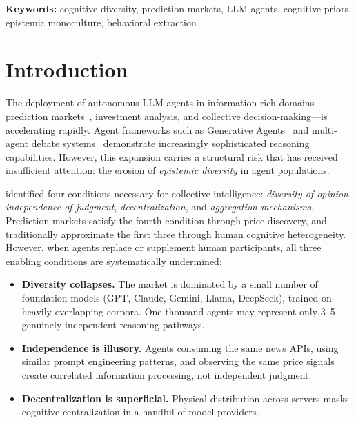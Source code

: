 \documentclass[11pt]{article}
\begin{document}
\vspace{0.5em}
\noindent\textbf{Keywords:} cognitive diversity, prediction markets, LLM agents, cognitive priors, epistemic monoculture, behavioral extraction

\section{Introduction}
\label{sec:intro}

The deployment of autonomous LLM agents in information-rich domains---prediction markets~\citep{hanson2003combinatorial}, investment analysis, and collective decision-making---is accelerating rapidly. Agent frameworks such as Generative Agents~\citep{park2023generative} and multi-agent debate systems~\citep{du2023debate} demonstrate increasingly sophisticated reasoning capabilities. However, this expansion carries a structural risk that has received insufficient attention: the erosion of \emph{epistemic diversity} in agent populations.

\citet{surowiecki2004wisdom} identified four conditions necessary for collective intelligence: \emph{diversity of opinion}, \emph{independence of judgment}, \emph{decentralization}, and \emph{aggregation mechanisms}. Prediction markets satisfy the fourth condition through price discovery, and traditionally approximate the first three through human cognitive heterogeneity. However, when agents replace or supplement human participants, all three enabling conditions are systematically undermined:

\begin{itemize}[leftmargin=*,itemsep=2pt]
    \item \textbf{Diversity collapses.} The market is dominated by a small number of foundation models (GPT, Claude, Gemini, Llama, DeepSeek), trained on heavily overlapping corpora. One thousand agents may represent only 3--5 genuinely independent reasoning pathways.
    \item \textbf{Independence is illusory.} Agents consuming the same news APIs, using similar prompt engineering patterns, and observing the same price signals create correlated information processing, not independent judgment.
    \item \textbf{Decentralization is superficial.} Physical distribution across servers masks cognitive centralization in a handful of model providers.
\end{itemize}
\end{document}
